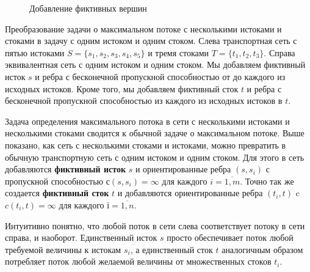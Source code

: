 \documentclass[a4paper,12pt]{article}
\begin{document}
\begin{figure}[!h]
		\caption{Добавление фиктивных вершин}
	\end{figure}

	Преобразование задачи о максимальном потоке с несколькими истоками и стоками в задачу с одним истоком и одним стоком. Слева транспортная сеть с пятью истоками $S = \{ s_1, s_2, s_3, s_4, s_5 \}$ и тремя стоками $T = \{ t_1, t_2, t_3 \}$. Справа эквивалентная сеть с одним истоком и одним стоком. Мы добавляем фиктивный исток $s$ и ребра с бесконечной пропускной способностью от до каждого из исходных истоков. Кроме того, мы добавляем фиктивный сток $t$ и ребра с бесконечной пропускной способностью из каждого из исходных истоков в $t$. 
	
	Задача определения максимального потока в сети с несколькими истоками и несколькими стоками сводится к обычной задаче о максимальном потоке. Выше показано, как сеть с несколькими стоками и истоками, можно превратить в обычную транспортную сеть с одним истоком и одним стоком. Для этого в сеть добавляются \textbf{фиктивный исток} $s$ и ориентированные ребра $(s, s_i)$ с пропускной способностью $с(s, s_i) = \infty$ для каждого $ i = \overline{1,m}$. Точно так же создается \textbf{фиктивный сток} $t$ и добавляются ориентированные ребра $(t_i, t)$ c $c(t_i,t) = \infty$ для каждого $і = \overline{1, n}$.
	
	Интуитивно понятно, что любой поток в сети слева соответствует потоку в сети справа, и наоборот. Единственный исток $s$ просто обеспечивает поток любой требуемой величины к истокам $s_i$, а единственный сток $t$ аналогичным образом потребляет поток любой желаемой величины от множественных стоков $t_i$.
	
\end{document}
